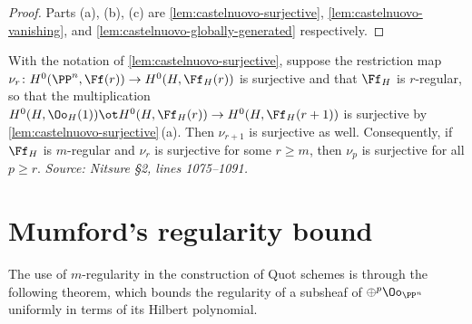 \begin{proof}
  Parts (a), (b), (c) are \cref{lem:castelnuovo-surjective},
  \cref{lem:castelnuovo-vanishing}, and \cref{lem:castelnuovo-globally-generated}
  respectively.
\end{proof}

\begin{remark}
  \label{rem:surjectivity-of-restriction}
  With the notation of \cref{lem:castelnuovo-surjective}, suppose the restriction
  map $\nu_r\colon H^0(\PP^n,\Ff(r))\to H^0(H,\Ff_H(r))$ is surjective and that
  $\Ff_H$ is $r$-regular, so that the multiplication
  $H^0(H,\Oo_H(1))\ot H^0(H,\Ff_H(r))\to H^0(H,\Ff_H(r+1))$ is surjective by
  \cref{lem:castelnuovo-surjective}\,(a). Then $\nu_{r+1}$ is surjective as well.
  Consequently, if $\Ff_H$ is $m$-regular and $\nu_r$ is surjective for some
  $r\ge m$, then $\nu_p$ is surjective for all $p\ge r$.
  \textit{Source: Nitsure \S2, lines 1075--1091.}
\end{remark}

\section{Mumford's regularity bound}

The use of $m$-regularity in the construction of Quot schemes is through the
following theorem, which bounds the regularity of a subsheaf of
$\oplus^p\Oo_{\PP^n}$ uniformly in terms of its Hilbert polynomial.

